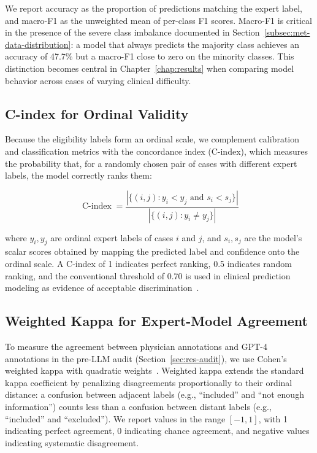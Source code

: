 We report accuracy as the proportion of predictions matching the expert 
label, and macro-F1 as the unweighted mean of per-class F1 scores. Macro-F1 
is critical in the presence of the severe class imbalance documented in 
Section~\ref{subsec:met-data-distribution}: a model that always predicts 
the majority class achieves an accuracy of 47.7\% but a macro-F1 close to 
zero on the minority classes. This distinction becomes central in 
Chapter~\ref{chap:results} when comparing model behavior across cases of 
varying clinical difficulty.

\subsection{C-index for Ordinal Validity}
\label{subsec:met-cindex}

Because the eligibility labels form an ordinal scale, we complement 
calibration and classification metrics with the concordance index 
(C-index), which measures the probability that, for a randomly chosen 
pair of cases with different expert labels, the model correctly ranks 
them:

\begin{equation}
    \operatorname{C-index} = \frac{
        |\{(i, j) : y_i < y_j \text{ and } s_i < s_j\}|
    }{
        |\{(i, j) : y_i \neq y_j\}|
    }
    \label{eq:cindex}
\end{equation}

where $y_i, y_j$ are ordinal expert labels of cases $i$ and $j$, and 
$s_i, s_j$ are the model's scalar scores obtained by mapping the 
predicted label and confidence onto the ordinal scale. A C-index of 1 
indicates perfect ranking, 0.5 indicates random ranking, and the 
conventional threshold of 0.70 is used in clinical prediction modeling as 
evidence of acceptable discrimination~\cite{vancalster2019calibration}.

\subsection{Weighted Kappa for Expert-Model Agreement}
\label{subsec:met-kappa}

To measure the agreement between physician annotations and GPT-4 
annotations in the pre-LLM audit (Section~\ref{sec:res-audit}), we use 
Cohen's weighted kappa with quadratic weights~\cite{cohen1968}. Weighted 
kappa extends the standard kappa coefficient by penalizing disagreements 
proportionally to their ordinal distance: a confusion between adjacent 
labels (e.g., ``included'' and ``not enough information'') counts less 
than a confusion between distant labels (e.g., ``included'' and 
``excluded''). We report values in the range $[-1, 1]$, with 1 
indicating perfect agreement, 0 indicating chance agreement, and 
negative values indicating systematic disagreement.

